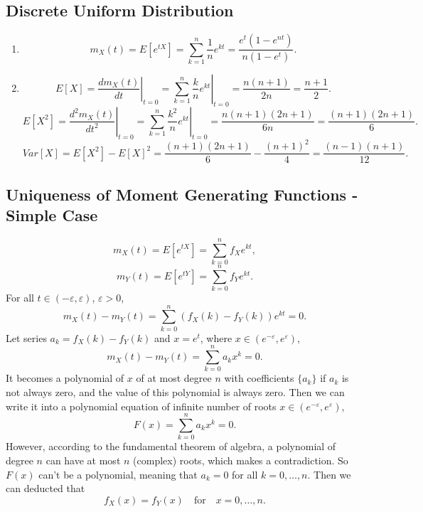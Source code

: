 \documentclass[11pt,a4paper]{article}
\begin{document}
\subsection{Discrete Uniform Distribution}

\begin{enumerate}[label=\roman*)]
\item 
$$m_X(t)=E[e^{tX}]=\sum_{k=1}^n\frac{1}{n}e^{kt}=\frac{e^t(1-e^{nt})}{n(1-e^t)}.$$
\item
$$E[X]=\left.\frac{dm_X(t)}{dt}\right|_{t=0}=\left.\sum_{k=1}^n\frac{k}{n}e^{kt}\right|_{t=0}=\frac{n(n+1)}{2n}=\frac{n+1}{2}.$$
$$E[X^2]=\left.\frac{d^2m_X(t)}{dt^2}\right|_{t=0}=\left.\sum_{k=1}^n\frac{k^2}{n}e^{kt}\right|_{t=0}=\frac{n(n+1)(2n+1)}{6n}=\frac{(n+1)(2n+1)}{6}.$$
$$Var[X]=E[X^2]-E[X]^2=\frac{(n+1)(2n+1)}{6}-\frac{(n+1)^2}{4}=\frac{(n-1)(n+1)}{12}.$$
\end{enumerate}

\subsection{Uniqueness of Moment Generating Functions - Simple Case}
$$m_X(t)=E[e^{tX}]=\sum_{k=0}^nf_Xe^{kt},$$
$$m_Y(t)=E[e^{tY}]=\sum_{k=0}^nf_Ye^{kt}.$$
For all $t\in(-\varepsilon,\varepsilon)$, $\varepsilon>0$,
$$m_X(t)-m_Y(t)=\sum_{k=0}^n(f_X(k)-f_Y(k))e^{kt}=0.$$
Let series $a_k=f_X(k)-f_Y(k)$ and $x=e^t$, where $x\in(e^{-\varepsilon},e^\varepsilon)$,
$$m_X(t)-m_Y(t)=\sum_{k=0}^na_kx^k=0.$$
It becomes a polynomial of $x$ of at most degree $n$ with coefficients $\{a_k\}$ if $a_k$ is not always zero, and the value of this polynomial is always zero. Then we can write it into a polynomial equation of infinite number of roots $x\in(e^{-\varepsilon},e^\varepsilon)$,
$$F(x)=\sum_{k=0}^na_kx^k=0.$$
However, according to the fundamental theorem of algebra, a polynomial of degree $n$ can have at most $n$ (complex) roots, which makes a contradiction. So $F(x)$ can't be a polynomial, meaning that $a_k=0$ for all $k=0,\dots,n$. Then we can deducted that
$$f_X(x)=f_Y(x)\quad\textrm{for}\quad x=0,\dots,n.$$
\end{document}
